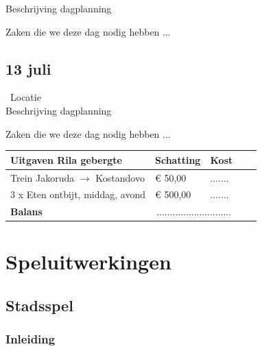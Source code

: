 \documentclass[fleqn,10pt]{src/KampSjabloon}
\begin{document}
Beschrijving dagplanning

\textcolor{color1}{\checked} Zaken die we deze dag nodig hebben ...

\subsection*{13 juli}
\label{13}
\point\ Locatie \\

Beschrijving dagplanning

\textcolor{color1}{\checked} Zaken die we deze dag nodig hebben ...

\begin{table}[H]
\begin{tabular}{lllll}
\toprule

 \textbf{Uitgaven Rila gebergte} & \textbf{Schatting} & \textbf{Kost} \\
\toprule
Trein Jakoruda $\rightarrow$ Kostandovo & \euro{ 50,00} &  ....... \\
3 x Eten ontbijt, middag, avond & \euro{ 500,00} &  .......  \\
\toprule
\textbf{Balans} & \multicolumn{2}{c}{............................}& & \\

\bottomrule
\end{tabular}
\label{tab:label}
\end{table}




\section{Speluitwerkingen}

\subsection*{Stadsspel}
\label{stdsspl} %

\subsubsection*{Inleiding}
\end{document}
